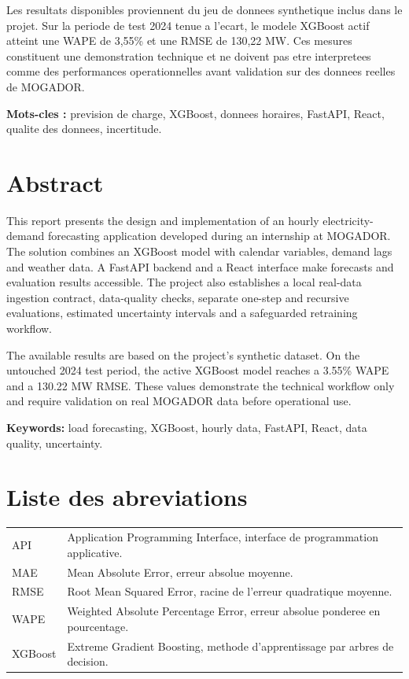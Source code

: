 \documentclass[12pt,a4paper,oneside]{report}
\begin{document}
Les resultats disponibles proviennent du jeu de donnees synthetique inclus dans le projet. Sur la periode de test 2024 tenue a l'ecart, le modele XGBoost actif atteint une WAPE de 3,55\% et une RMSE de 130,22 MW. Ces mesures constituent une demonstration technique et ne doivent pas etre interpretees comme des performances operationnelles avant validation sur des donnees reelles de MOGADOR.

\textbf{Mots-cles :} prevision de charge, XGBoost, donnees horaires, FastAPI, React, qualite des donnees, incertitude.

\chapter*{Abstract}
This report presents the design and implementation of an hourly electricity-demand forecasting application developed during an internship at MOGADOR. The solution combines an XGBoost model with calendar variables, demand lags and weather data. A FastAPI backend and a React interface make forecasts and evaluation results accessible. The project also establishes a local real-data ingestion contract, data-quality checks, separate one-step and recursive evaluations, estimated uncertainty intervals and a safeguarded retraining workflow.

The available results are based on the project's synthetic dataset. On the untouched 2024 test period, the active XGBoost model reaches a 3.55\% WAPE and a 130.22 MW RMSE. These values demonstrate the technical workflow only and require validation on real MOGADOR data before operational use.

\textbf{Keywords:} load forecasting, XGBoost, hourly data, FastAPI, React, data quality, uncertainty.

\tableofcontents
\listoffigures
\listoftables

\chapter*{Liste des abreviations}
\begin{longtable}{p{3cm}p{10cm}}
API & Application Programming Interface, interface de programmation applicative.\\
MAE & Mean Absolute Error, erreur absolue moyenne.\\
RMSE & Root Mean Squared Error, racine de l'erreur quadratique moyenne.\\
WAPE & Weighted Absolute Percentage Error, erreur absolue ponderee en pourcentage.\\
XGBoost & Extreme Gradient Boosting, methode d'apprentissage par arbres de decision.\\
\end{longtable}
\end{document}
